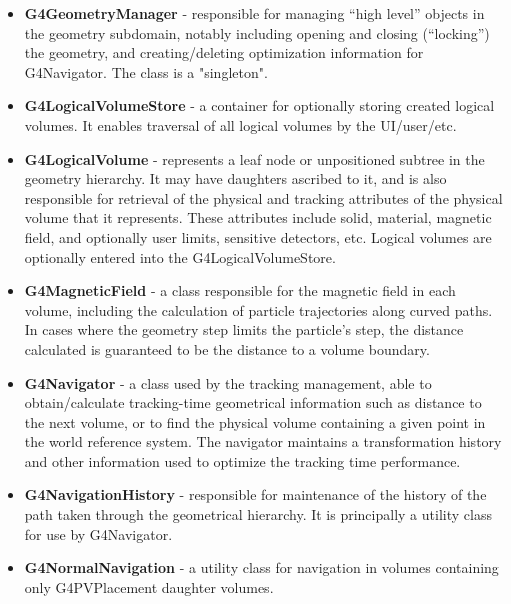\begin{itemize}

\item {\bf G4GeometryManager} -
   responsible for managing ``high level'' objects in the geometry subdomain, 
   notably including opening and closing (``locking'') the geometry, and 
   creating/deleting optimization information for G4Navigator. The class is 
   a "singleton".
 
\item {\bf G4LogicalVolumeStore} -
   a container for optionally storing created logical volumes. It enables 
   traversal of all logical volumes by the UI/user/etc.
 
\item {\bf G4LogicalVolume} -
   represents a leaf node or unpositioned subtree in the geometry hierarchy. 
   It may have daughters ascribed to it, and is also responsible for 
   retrieval of the physical and tracking attributes of the physical volume 
   that it represents.  These attributes include solid, material, magnetic 
   field, and optionally user limits, sensitive detectors, etc.  Logical
   volumes are optionally entered into the G4LogicalVolumeStore.
 
\item {\bf G4MagneticField} -
   a class responsible for the magnetic field in each volume, including the 
   calculation of particle trajectories along curved paths. In cases where 
   the geometry step limits the particle's step, the distance calculated 
   is guaranteed to be the distance to a volume boundary.
 
\item {\bf G4Navigator} -
   a class used by the tracking management, able to obtain/calculate 
   tracking-time geometrical information such as distance to the next volume, 
   or to find the physical volume containing a given point in the world 
   reference system.  The navigator maintains a transformation history and 
   other information used to optimize the tracking time performance. 

\item {\bf G4NavigationHistory} -
   responsible for maintenance of the history of the path taken through the 
   geometrical hierarchy.  It is principally a utility class for use by 
   G4Navigator.
 
\item {\bf G4NormalNavigation} -
   a utility class for navigation in volumes containing only G4PVPlacement 
   daughter volumes.
 

\end{itemize}
